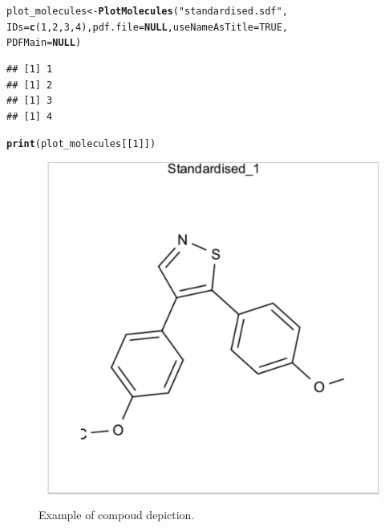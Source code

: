 \documentclass[twoside,a4wide,12pt]{article}\usepackage[]{graphicx}\usepackage[]{color}
\makeatletter
\newcommand{\hlnum}[1]{\textcolor[rgb]{0.686,0.059,0.569}{#1}}%
\newcommand{\hlstr}[1]{\textcolor[rgb]{0.192,0.494,0.8}{#1}}%
\newcommand{\hlstd}[1]{\textcolor[rgb]{0.345,0.345,0.345}{#1}}%
\newcommand{\hlkwa}[1]{\textcolor[rgb]{0.161,0.373,0.58}{\textbf{#1}}}%
\newcommand{\hlkwb}[1]{\textcolor[rgb]{0.69,0.353,0.396}{#1}}%
\newcommand{\hlkwc}[1]{\textcolor[rgb]{0.333,0.667,0.333}{#1}}%
\newcommand{\hlkwd}[1]{\textcolor[rgb]{0.737,0.353,0.396}{\textbf{#1}}}%
\newenvironment{kframe}{%
 \def\at@end@of@kframe{}%
 \ifinner\ifhmode%
  \def\at@end@of@kframe{\end{minipage}}%
  \begin{minipage}{\columnwidth}%
 \fi\fi%
 \def\FrameCommand##1{\hskip\@totalleftmargin \hskip-\fboxsep
 \colorbox{shadecolor}{##1}\hskip-\fboxsep
     \hskip-\linewidth \hskip-\@totalleftmargin \hskip\columnwidth}%
 \MakeFramed {\advance\hsize-\width
   \@totalleftmargin\z@ \linewidth\hsize
   \@setminipage}}%
 {\par\unskip\endMakeFramed%
 \at@end@of@kframe}
\newenvironment{knitrout}{}{} %
\makeatother
\begin{document}
\begin{knitrout}
\color{fgcolor}\begin{kframe}
\begin{alltt}
\hlstd{plot_molecules} \hlkwb{<-} \hlkwd{PlotMolecules}\hlstd{(}\hlstr{"standardised.sdf"}\hlstd{,}
    \hlkwc{IDs} \hlstd{=} \hlkwd{c}\hlstd{(}\hlnum{1}\hlstd{,} \hlnum{2}\hlstd{,} \hlnum{3}\hlstd{,} \hlnum{4}\hlstd{),} \hlkwc{pdf.file} \hlstd{=} \hlkwa{NULL}\hlstd{,} \hlkwc{useNameAsTitle} \hlstd{=} \hlnum{TRUE}\hlstd{,}
    \hlkwc{PDFMain} \hlstd{=} \hlkwa{NULL}\hlstd{)}
\end{alltt}
\begin{verbatim}
## [1] 1
## [1] 2
## [1] 3
## [1] 4
\end{verbatim}
\begin{alltt}
\hlkwd{print}\hlstd{(plot_molecules[[}\hlnum{1}\hlstd{]])}
\end{alltt}
\end{kframe}\begin{figure}[]


{\centering \includegraphics[width=12cm]{figure/unnamed-chunk-20} 

}

\caption[Example of compoud depiction]{Example of compoud depiction.\label{fig:unnamed-chunk-20}}
\end{figure}


\end{knitrout}
\end{document}
